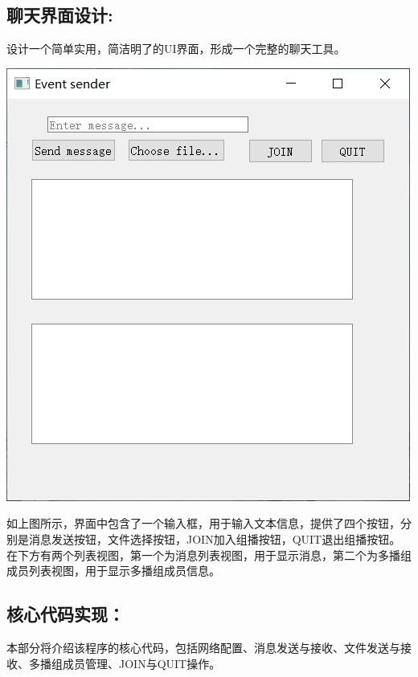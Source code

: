 \documentclass[UTF8]{ctexart}
\begin{document}
\subsection{聊天界面设计:}{设计一个简单实用，简洁明了的UI界面，形成一个完整的聊天工具。}
\par\centerline{\includegraphics[scale=0.6]{UI.png}}
\par{如上图所示，界面中包含了一个输入框，用于输入文本信息，提供了四个按钮，分别是消息发送按钮，文件选择按钮，JOIN加入组播按钮，QUIT退出组播按钮。在下方有两个列表视图，第一个为消息列表视图，用于显示消息，第二个为多播组成员列表视图，用于显示多播组成员信息。
}
\subsection{核心代码实现：}{本部分将介绍该程序的核心代码，包括网络配置、消息发送与接收、文件发送与接收、多播组成员管理、JOIN与QUIT操作。}
\end{document}
